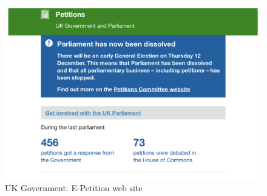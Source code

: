 \begin{figure}[h]
  \centering
  \includegraphics[scale=0.3]{images/e-petition-site}
  \caption{UK Government: E-Petition web site}
  \label{fig:e-petition-site}
\end{figure}